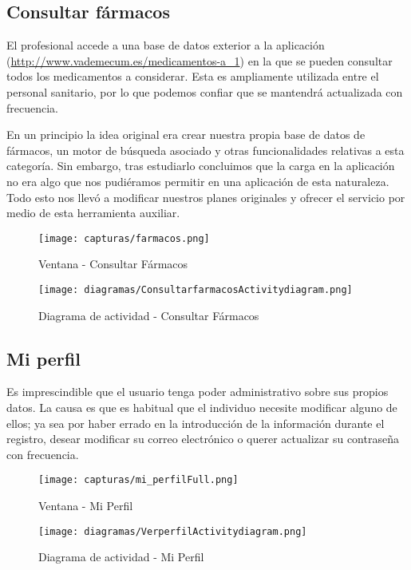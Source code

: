 \documentclass[11pt,spanish,
		listoftables,listoffigures]
		{tfgplantilla}
\begin{document}
\subsection {Consultar fármacos}

El profesional accede a una base de datos exterior a la aplicación (\url {http://www.vademecum.es/medicamentos-a_1}) en la que se pueden consultar todos los medicamentos a considerar. Esta es ampliamente utilizada entre el personal sanitario, por lo que podemos confiar que se mantendrá actualizada con frecuencia.

En un principio la idea original era crear nuestra propia base de datos de fármacos, un motor de búsqueda asociado y otras funcionalidades relativas a esta categoría. Sin embargo, tras estudiarlo concluimos que la carga en la aplicación no era algo que nos pudiéramos permitir en una aplicación de esta naturaleza. Todo esto nos llevó a modificar nuestros planes originales y ofrecer el servicio por medio de esta herramienta auxiliar.

\begin{figure}[H]
\centering
\texttt{[image: capturas/farmacos.png]}
\caption{Ventana - Consultar Fármacos}
\end{figure}

\begin{figure}[H]
\centering
\texttt{[image: diagramas/ConsultarfarmacosActivitydiagram.png]}
\caption{Diagrama de actividad -  Consultar Fármacos}
\end{figure}

\vfill
\subsection {Mi perfil}

Es imprescindible que el usuario tenga poder administrativo sobre sus propios datos. La causa es que es habitual que el individuo necesite modificar alguno de ellos; ya sea por haber errado en la introducción de la información durante el registro, desear modificar su correo electrónico o querer actualizar su contraseña con frecuencia.

\begin{figure}[H]
\centering
\texttt{[image: capturas/mi\_perfilFull.png]}
\caption{Ventana - Mi Perfil}
\end{figure}

\vfill
\begin{figure}[H]
\centering
\texttt{[image: diagramas/VerperfilActivitydiagram.png]}
\caption{Diagrama de actividad -  Mi Perfil}
\end{figure}
\end{document}
